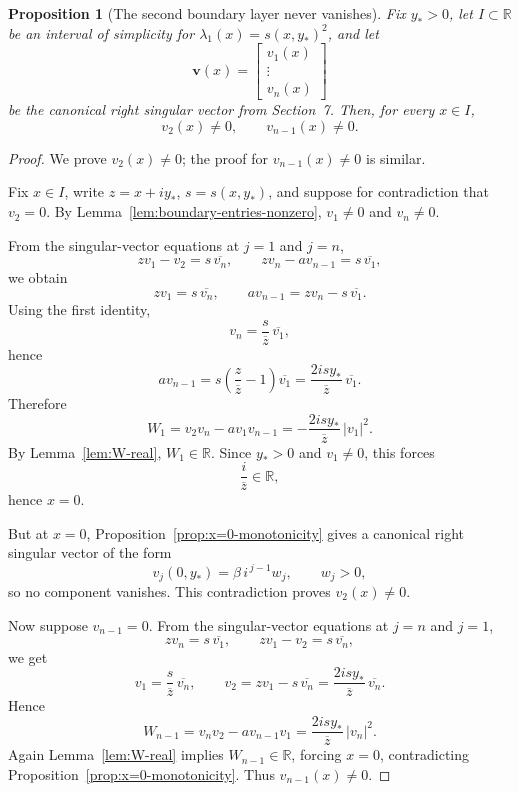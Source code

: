 \documentclass[11pt]{article}
\newtheorem{proposition}[theorem]{Proposition}
\begin{document}
\begin{proposition}[The second boundary layer never vanishes]\label{prop:second-layer-nonzero}
Fix \(y_*>0\), let \(I\subset\mathbb R\) be an interval of simplicity for \(\lambda_1(x)=s(x,y_*)^2\), and let
\[
\mathbf v(x)=
\begin{bmatrix}
v_1(x)\\ \vdots\\ v_n(x)
\end{bmatrix}
\]
be the canonical right singular vector from Section~7. Then, for every \(x\in I\),
\[
v_2(x)\neq 0,
\qquad
v_{n-1}(x)\neq 0.
\]
\end{proposition}

\begin{proof}
We prove \(v_2(x)\neq 0\); the proof for \(v_{n-1}(x)\neq 0\) is similar.

Fix \(x\in I\), write \(z=x+iy_*\), \(s=s(x,y_*)\), and suppose for contradiction that \(v_2=0\).
By Lemma~\ref{lem:boundary-entries-nonzero}, \(v_1\neq 0\) and \(v_n\neq 0\).

From the singular-vector equations at \(j=1\) and \(j=n\),
\[
z v_1-v_2=s\,\overline{v_n},
\qquad
z v_n-a v_{n-1}=s\,\overline{v_1},
\]
we obtain
\[
z v_1=s\,\overline{v_n},
\qquad
a v_{n-1}=z v_n-s\,\overline{v_1}.
\]
Using the first identity,
\[
v_n=\frac{s}{\overline z}\,\overline{v_1},
\]
hence
\[
a v_{n-1}
=
s\left(\frac{z}{\overline z}-1\right)\overline{v_1}
=
\frac{2isy_*}{\overline z}\,\overline{v_1}.
\]
Therefore
\[
W_1
=
v_2v_n-a v_1v_{n-1}
=
-\frac{2isy_*}{\overline z}\,|v_1|^2.
\]
By Lemma~\ref{lem:W-real}, \(W_1\in\mathbb R\). Since \(y_*>0\) and \(v_1\neq 0\), this forces
\[
\frac{i}{\overline z}\in\mathbb R,
\]
hence \(x=0\).

But at \(x=0\), Proposition~\ref{prop:x=0-monotonicity} gives a canonical right singular vector of the form
\[
v_j(0,y_*)=\beta\, i^{\,j-1} w_j,
\qquad
w_j>0,
\]
so no component vanishes. This contradiction proves \(v_2(x)\neq 0\).

Now suppose \(v_{n-1}=0\). From the singular-vector equations at \(j=n\) and \(j=1\),
\[
z v_n=s\,\overline{v_1},
\qquad
z v_1-v_2=s\,\overline{v_n},
\]
we get
\[
v_1=\frac{s}{\overline z}\,\overline{v_n},
\qquad
v_2
=
z v_1-s\,\overline{v_n}
=
\frac{2isy_*}{\overline z}\,\overline{v_n}.
\]
Hence
\[
W_{n-1}
=
v_n v_2-a v_{n-1}v_1
=
\frac{2isy_*}{\overline z}\,|v_n|^2.
\]
Again Lemma~\ref{lem:W-real} implies \(W_{n-1}\in\mathbb R\), forcing \(x=0\), contradicting Proposition~\ref{prop:x=0-monotonicity}. Thus \(v_{n-1}(x)\neq 0\).
\end{proof}
\end{document}
